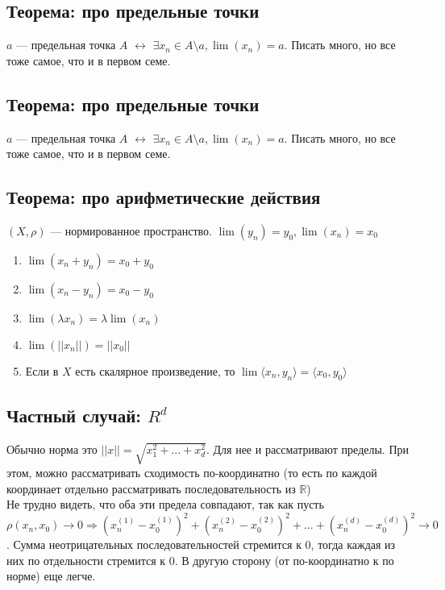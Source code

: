 \documentclass[12pt]{report} %
\begin{document}
\subsection*{Теорема: про предельные точки}
$a$ --- предельная точка $A$ $\leftrightarrow$ $\exists x_n \in A\setminus a, \lim(x_n) = a$. Писать много, но все тоже самое, что и в первом семе.

\subsection*{Теорема: про предельные точки}
$a$ --- предельная точка $A$ $\leftrightarrow$ $\exists x_n \in A\setminus a, \lim(x_n) = a$. Писать много, но все тоже самое, что и в первом семе.

\subsection*{Теорема: про арифметические действия}
$(X, \rho)$ --- нормированное пространство. $\lim(y_n) = y_0, \lim(x_n) = x_0$
\begin{enumerate}
\item $\lim(x_n + y_n) = x_0 + y_0$
\item $\lim(x_n - y_n) = x_0 - y_0$
\item $\lim(\lambda x_n) = \lambda\lim(x_n)$
\item $\lim(||x_n||) = ||x_0||$
\item Если в $X$ есть скалярное произведение, то $\lim \langle x_n, y_n \rangle = \langle x_0, y_0 \rangle$
\end{enumerate}

\subsection*{Частный случай: $R^d$}
Обычно норма это $||x|| = \sqrt{x_1^2 + ... + x_d^2}$. Для нее и рассматривают пределы. При этом, можно рассматривать сходимость по-координатно (то есть по каждой координает отдельно рассматривать последовательность из $\mathbb{R}$)\\

Не трудно видеть, что оба эти предела совпадают, так как пусть ${\rho(x_n, x_0) \rightarrow 0} \Rightarrow \left(x_n^{(1)} - x_0^{(1)}\right)^2 +  \left(x_n^{(2)} - x_0^{(2)}\right)^2 + ... + \left(x_n^{(d)} - x_0^{(d)}\right)^2 \rightarrow 0$. Сумма неотрицательных последовательностей стремится к 0, тогда каждая из них по отдельности стремится к 0. В другую сторону (от по-координатно к по норме) еще легче.
\end{document}
